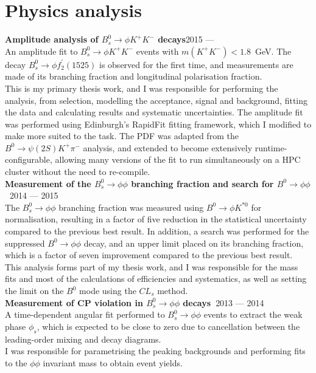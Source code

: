 \documentclass[contbibnum,titleabove]{simplecv}
\newcommand\dateditem[2]{#1\hfill#2\\}
\newcommand\topictitle[3]{\dateditem{{\textbf{#1}}}{#3}#2}
\begin{document}
	\section{Physics analysis}
	\topictitle{Amplitude analysis of $B^0_s \to \phi K^{+}K^{-}$ decays}{}{2015 ---}
	An amplitude fit to ${B^0_s \to \phi K^{+}K^{-}}$ events with ${m(K^{+}K^{-})<1.8}$~GeV. The decay ${B^0_s \to \phi f_2^\prime(1525)}$ is observed for the first time, and measurements are made of its branching fraction and longitudinal polarisation fraction.
	\\[0.5em]
	This is my primary thesis work, and I was responsible for performing the analysis, from selection, modelling the acceptance, signal and background, fitting the data and calculating results and systematic uncertainties.
	The amplitude fit was performed using Edinburgh's RapidFit fitting framework, which I modified to make more suited to the task.
	The PDF was adapted from the $B^0 \to \psi(2S) K^{+} \pi^{-}$ analysis, and extended to become extensively runtime-configurable, allowing many versions of the fit to run simultaneously on a HPC cluster without the need to re-compile.
	\\[0.5em]
	\topictitle{Measurement of the $B^0_s \to \phi\phi$ branching fraction and search for $B^0 \to \phi \phi$~\textnormal{\cite{phiphiBF}}}{}{2014 --- 2015}
	The $B^0_s \to \phi\phi$ branching fraction was measured using $B^0 \to \phi K^{*0}$ for normalisation, resulting in a factor of five reduction in the statistical uncertainty compared to the previous best result.
	In addition, a search was performed for the suppressed $B^0 \to \phi\phi$ decay, and an upper limit placed on its branching fraction, which is a factor of seven improvement compared to the previous best result.
	\\[0.5em]
	This analysis forms part of my thesis work, and I was responsible for the mass fits and most of the calculations of efficiencies and systematics, as well as setting the limit on the $B^0$ mode using the $CL_s$ method.
	\\[0.5em]
	\topictitle{Measurement of CP violation in $B^0_s \to \phi\phi$ decays~\textnormal{\cite{phiphiCPV}}}{}{2013 --- 2014}
	A time-dependent angular fit performed to $B^0_s \to \phi\phi$ events to extract the weak phase $\phi_s$, which is expected to be close to zero due to cancellation between the leading-order mixing and decay diagrams.
	\\[0.5em]
	I was responsible for parametrising the peaking backgrounds and performing fits to the $\phi\phi$ invariant mass to obtain event yields.
\end{document}
